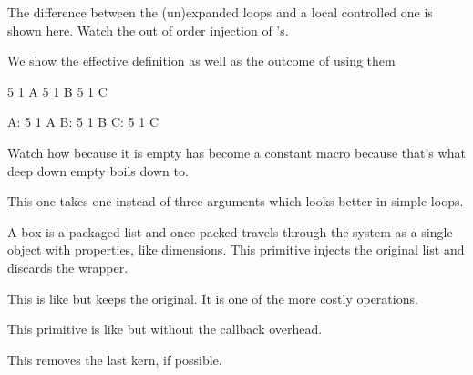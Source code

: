 \typebuffer

\start \veryraggedright \tt\tfx \getbuffer \stop \blank

The difference between the (un)expanded loops and a local controlled
one is shown here. Watch the out of order injection of 's.

\startbuffer
\edef\TestA{\localcontrolledloop 1 5 1 {A}} %
\edef\TestB{\expandedloop        1 5 1 {B}}
\edef\TestC{\unexpandedloop      1 5 1 {C\relax}}
\stopbuffer

\typebuffer \getbuffer

We show the effective definition as well as the outcome of using them

\startbuffer
\meaningasis\TestA
\meaningasis\TestB
\meaningasis\TestC

A: \TestA
B: \TestB
C: \TestC
\stopbuffer

\typebuffer \startlines \tttf \getbuffer \stoplines

Watch how because it is empty \type {\TestA} has become a constant macro because
that's what deep down empty boils down to.

\stopnewprimitive

\startnewprimitive[title={\prm {unexpandedrepeat}}]

This one takes one instead of three arguments which looks better in simple loops.

\stopnewprimitive

\startoldprimitive[title={\prm {unhbox}}]

A box is a packaged list and once packed travels through the system as a single
object with properties, like dimensions. This primitive injects the original list
and discards the wrapper.

\stopoldprimitive

\startoldprimitive[title={\prm {unhcopy}}]

This is like  but keeps the original. It is one of the more costly
operations.

\stopoldprimitive

\startnewprimitive[title={\prm {unhpack}}]

This primitive is like  but without the callback overhead.

\stopnewprimitive

\startoldprimitive[title={\prm {unkern}}]

This removes the last kern, if possible.

\stopoldprimitive

